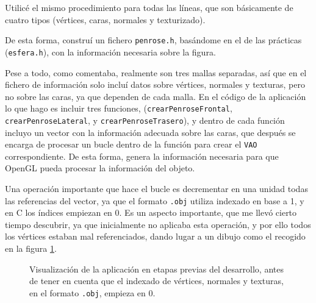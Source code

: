 \documentclass[a4paper,12pt]{article}
\begin{document}
Utilicé el mismo procedimiento para todas las líneas, que son básicamente de cuatro tipos (vértices, caras, normales y texturizado).

De esta forma, construí un fichero \texttt{penrose.h}, basándome en el de las prácticas (\texttt{esfera.h}), con la información necesaria sobre la figura.

Pese a todo, como comentaba, realmente son tres mallas separadas, así que en el fichero de información solo incluí datos sobre vértices, normales y texturas, pero no sobre las caras, ya que dependen de cada malla. En el código de la aplicación lo que hago es incluir tres funciones, (\texttt{crearPenroseFrontal}, \texttt{crearPenroseLateral}, y \texttt{crearPenroseTrasero}), y dentro de cada función incluyo un vector con la información adecuada sobre las caras, que después se encarga de procesar un bucle dentro de la función para crear el \texttt{VAO} correspondiente. De esta forma, genera la información necesaria para que OpenGL pueda procesar la información del objeto.

Una operación importante que hace el bucle es decrementar en una unidad todas las referencias del vector, ya que el formato \texttt{.obj} utiliza indexado en base a 1, y en C los índices empiezan en 0. Es un aspecto importante, que me llevó cierto tiempo descubrir, ya que inicialmente no aplicaba esta operación, y por ello todos los vértices estaban mal referenciados, dando lugar a un dibujo como el recogido en la figura \ref{antes_de_corregir_indexado}.

\begin{figure}
    \centering
    \caption{Visualización de la aplicación en etapas previas del desarrollo, antes de tener en cuenta que el indexado de vértices, normales y texturas, en el formato \texttt{.obj}, empieza en 0.} \label{antes_de_corregir_indexado}
\end{figure}
\end{document}
